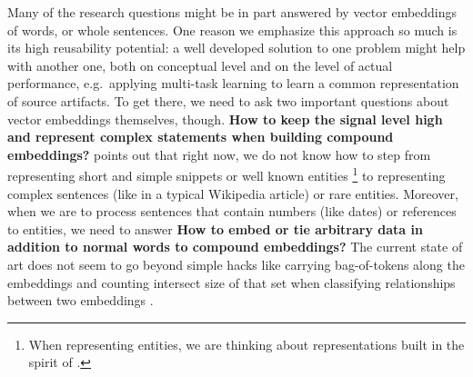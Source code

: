 Many of the research questions might be in part answered by
vector embeddings of words, or whole sentences.
One reason we emphasize this approach so much is its high reusability potential:
a well developed solution to one problem might help with another one, both
on conceptual level and on the level of actual performance, e.g.\ applying
multi-task learning to learn a common representation of source artifacts.
To get there, we need to ask two important questions about vector embeddings
themselves, though.
\textbf{How to keep the signal level high and represent
complex statements when building compound embeddings?} points out that right
now, we do not know how to step from representing short and simple snippets or well known entities%
\footnote{When representing entities, we are thinking about representations
built in the spirit of \cite{QANTA}.}
to representing complex sentences (like in a typical Wikipedia article) or
rare entities.
Moreover, when we are to process sentences that contain numbers (like dates)
or references to entities, we need to answer
\textbf{How to embed or tie arbitrary data in addition to normal words
to compound embeddings?}
The current state of art does not seem to go beyond simple hacks like
carrying bag-of-tokens along the embeddings and counting intersect size
of that set when classifying relationships between two embeddings \citep{Yu2014Deep}.
